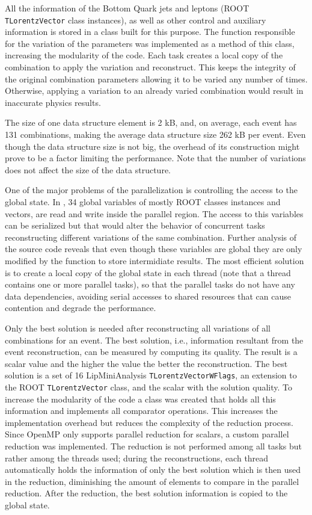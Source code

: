 All the information of the Bottom Quark jets and leptons (ROOT \texttt{TLorentzVector} class instances), as well as other control and auxiliary information is stored in a class built for this purpose. The function responsible for the variation of the parameters was implemented as a method of this class, increasing the modularity of the code. Each task creates a local copy of the combination to apply the variation and reconstruct. This keeps the integrity of the original combination parameters allowing it to be varied any number of times. Otherwise, applying a variation to an already varied combination would result in inaccurate physics results.

The size of one data structure element is 2 kB, and, on average, each event has 131 combinations, making the average data structure size 262 kB per event. Even though the data structure size is not big, the overhead of its construction might prove to be a factor limiting the performance. Note that the number of variations does not affect the size of the data structure.

One of the major problems of the parallelization is controlling the access to the global state. In \ttDilepKinFit, 34 global variables of mostly ROOT classes instances and vectors, are read and write inside the parallel region. The access to this variables can be serialized but that would alter the behavior of concurrent tasks reconstructing different variations of the same combination. Further analysis of the source code reveals that even though these variables are global they are only modified by the \ttDilepKinFit function to store intermidiate results. The most efficient solution is to create a local copy of the global state in each thread (note that a thread contains one or more parallel tasks), so that the parallel tasks do not have any data dependencies, avoiding serial accesses to shared resources that can cause contention and degrade the performance.

Only the best solution is needed after reconstructing all variations of all combinations for an event. The best solution, i.e., information resultant from the event reconstruction, can be measured by computing its quality. The result is a scalar value and the higher the value the better the reconstruction. The best solution is a set of 16 LipMiniAnalysis \texttt{TLorentzVectorWFlags}, an extension to the ROOT \texttt{TLorentzVector} class, and the scalar with the solution quality. To increase the modularity of the code a class was created that holds all this information and implements all comparator operations. This increases the implementation overhead but reduces the complexity of the reduction process. Since OpenMP only supports parallel reduction for scalars, a custom parallel reduction was implemented. The reduction is not performed among all tasks but rather among the threads used; during the reconstructions, each thread automatically holds the information of only the best solution which is then used in the reduction, diminishing the amount of elements to compare in the parallel reduction. After the reduction, the best solution information is copied to the global state.

